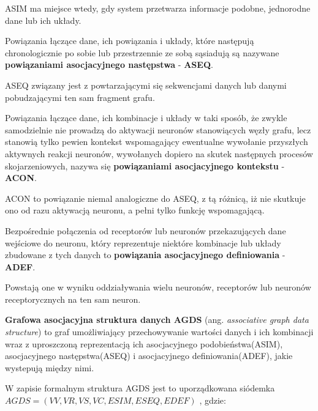 ASIM ma miejsce wtedy, gdy system przetwarza informacje podobne, jednorodne dane lub ich układy.

\begin{definicja}
    Powiązania łączące dane, ich powiązania i układy, które następują chronologicznie po sobie lub przestrzennie ze sobą sąsiadują są nazywane
    \textbf{powiązaniami asocjacyjnego następstwa} - \textbf{ASEQ}.
\end{definicja}

ASEQ związany jest z powtarzającymi się sekwencjami danych lub danymi pobudzającymi ten sam fragment grafu.

\begin{definicja}
    Powiązania łączące dane, ich kombinacje i układy w taki sposób, że zwykle samodzielnie nie prowadzą do aktywacji neuronów stanowiących węzły
    grafu, lecz stanowią tylko pewien kontekst wspomagający ewentualne wywołanie przyszłych aktywnych reakcji neuronów, wywołanych dopiero na skutek
    następnych procesów skojarzeniowych, nazywa się \textbf{powiązaniami asocjacyjnego kontekstu} - \textbf{ACON}.
\end{definicja}

ACON to powiązanie niemal analogiczne do ASEQ, z tą różnicą, iż nie skutkuje ono od razu aktywacją neuronu, a pełni tylko funkcję wspomagającą.

\begin{definicja}
    Bezpośrednie połączenia od receptorów lub neuronów przekazujących dane wejściowe do neuronu, który reprezentuje niektóre kombinacje lub układy 
    zbudowane z tych danych to \textbf{powiązania asocjacyjnego definiowania} - \textbf{ADEF}.
\end{definicja}

Powstają one w wyniku oddziaływania wielu neuronów, receptorów lub neuronów receptorycznych na ten sam neuron.

\begin{definicja}
    \label{def:agds}
    \textbf{Grafowa asocjacyjna struktura danych AGDS} (ang. \emph{associative graph data structure}) to graf umożliwiający przechowywanie wartości danych
    i ich kombinacji wraz z uproszczoną reprezentacją ich asocjacyjnego podobieństwa(ASIM), asocjacyjnego następstwa(ASEQ) i asocjacyjnego definiowania(ADEF), jakie wystepują między nimi.
\end{definicja}

W zapisie formalnym struktura AGDS jest to uporządkowana siódemka \linebreak \(AGDS = (VV, VR, VS, VC, ESIM, ESEQ, EDEF) \) \cite[s. 109]{Horzyk}, gdzie:

